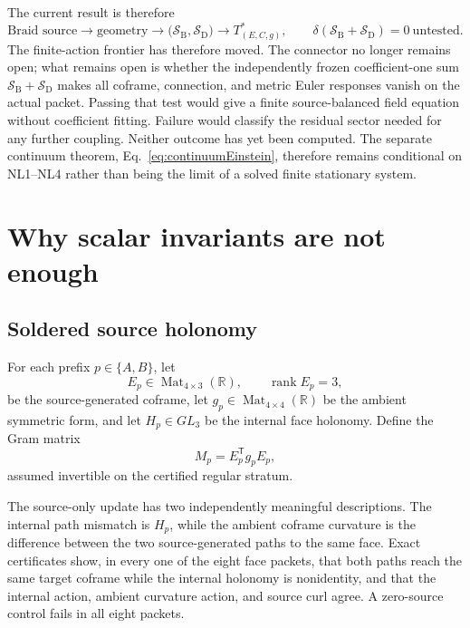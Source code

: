 \documentclass[11pt]{article}
\theoremstyle{definition}
\theoremstyle{remark}
\newcommand{\rank}{\operatorname{rank}}
\begin{document}
The current result is therefore
\begin{equation}\label{eq:frontier}
 \boxed{
 \text{Braid source}\to\text{geometry}
 \to\bigl(\mathcal S_{\mathrm B},\mathcal S_{\mathrm D}\bigr)
 \to T^*_{(E,C,g)},
 \qquad
 \delta\!\left(\mathcal S_{\mathrm B}+\mathcal S_{\mathrm D}\right)=0
 \ \text{untested}.}
\end{equation}
The finite-action frontier has therefore moved. The connector no longer remains open; what remains open is whether the independently frozen coefficient-one sum $\mathcal S_{\mathrm B}+\mathcal S_{\mathrm D}$ makes all coframe, connection, and metric Euler responses vanish on the actual packet. Passing that test would give a finite source-balanced field equation without coefficient fitting. Failure would classify the residual sector needed for any further coupling. Neither outcome has yet been computed. The separate continuum theorem, Eq.~\eqref{eq:continuumEinstein}, therefore remains conditional on NL1--NL4 rather than being the limit of a solved finite stationary system.

\section{Why scalar invariants are not enough}

\subsection{Soldered source holonomy}

For each prefix $p\in\{A,B\}$, let
\[
 E_p\in\operatorname{Mat}_{4\times3}(\mathbb R),\qquad
 \rank E_p=3,
\]
be the source-generated coframe, let $g_p\in\operatorname{Mat}_{4\times4}(\mathbb R)$ be the ambient symmetric form, and let $H_p\in GL_3$ be the internal face holonomy. Define the Gram matrix
\begin{equation}\label{eq:gram}
 M_p=E_p^{\mathsf T}g_pE_p,
\end{equation}
assumed invertible on the certified regular stratum.

The source-only update has two independently meaningful descriptions. The internal path mismatch is $H_p$, while the ambient coframe curvature is the difference between the two source-generated paths to the same face. Exact certificates show, in every one of the eight face packets, that both paths reach the same target coframe while the internal holonomy is nonidentity, and that the internal action, ambient curvature action, and source curl agree. A zero-source control fails in all eight packets.
\end{document}

